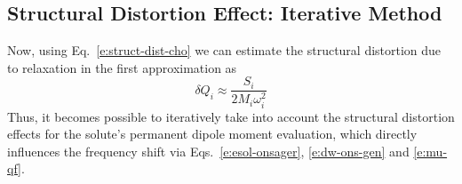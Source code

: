 \documentclass[b5paper,oneside,fleqn,11pt]{book}
\begin{document}
\begin{refsection}
\subsection{Structural Distortion Effect: Iterative Method}

Now, using Eq.~\eqref{e:struct-dist-cho}
we can estimate the structural distortion due to relaxation 
in the first approximation as
%
\begin{equation} \label{e:ons-dq-init}
\delta Q_i \approx \frac{S_i}{2M_i\omega_i^2}
\end{equation}
%
Thus, it becomes possible to iteratively take into account 
the structural distortion effects for the solute's permanent
dipole moment evaluation, which directly influences the 
frequency shift via Eqs.~\eqref{e:esol-onsager}, 
\eqref{e:dw-ons-gen} and \eqref{e:mu-qf}.


\end{refsection}
\end{document}
